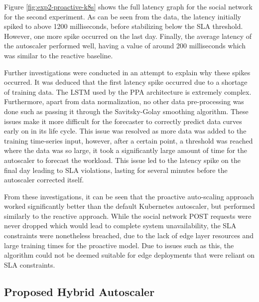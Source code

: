 Figure \ref{fig:exp2-proactive-k8s} shows the full latency graph for the social network for the second experiment. As can be seen from the data, the latency initially spiked to above 1200 milliseconds, before stabilizing below the SLA threshold. However, one more spike occurred on the last day. Finally, the average latency of the autoscaler performed well, having a value of around 200 milliseconds which was similar to the reactive baseline.\par

Further investigations were conducted in an attempt to explain why these spikes occurred. It was deduced that the first latency spike occurred due to a shortage of training data. The LSTM used by the PPA architecture is extremely complex. Furthermore, apart from data normalization, no other data pre-processing was done such as passing it through the Savitsky-Golay smoothing algorithm. These issues make it more difficult for the forecaster to correctly predict data curves early on in its life cycle. This issue was resolved as more data was added to the training time-series input, however, after a certain point, a threshold was reached where the data was so large, it took a significantly large amount of time for the autoscaler to forecast the workload. This issue led to the latency spike on the final day leading to SLA violations, lasting for several minutes before the autoscaler corrected itself.\par

From these investigations, it can be seen that the proactive auto-scaling approach worked significantly better than the default Kubernetes autoscaler, but performed similarly to the reactive approach. While the social network POST requests were never dropped which would lead to complete system unavailability, the SLA constraints were nonetheless breached, due to the lack of edge layer resources and large training times for the proactive model. Due to issues such as this, the algorithm could not be deemed suitable for edge deployments that were reliant on SLA constraints.\par

\subsection {Proposed Hybrid Autoscaler}
\label{subsec:ch6-hybrid-algo}

